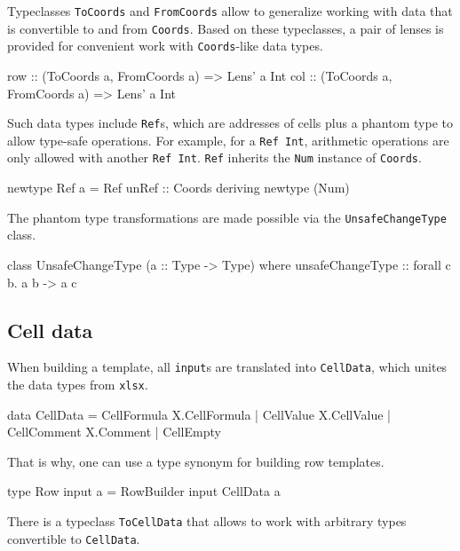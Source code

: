 Typeclasses \texttt{ToCoords} and \texttt{FromCoords} allow to generalize working with data that is convertible to and from \texttt{Coords}. Based on these typeclasses, a pair of lenses is provided for convenient work with \texttt{Coords}-like data types.

\begin{mycode}
row :: (ToCoords a, FromCoords a) => Lens' a Int
col :: (ToCoords a, FromCoords a) => Lens' a Int
\end{mycode}

Such data types include \texttt{Ref}s, which are addresses of cells plus a phantom type to allow type-safe operations. For example, for a \texttt{Ref Int}, arithmetic operations are only allowed with another \texttt{Ref Int}. \texttt{Ref} inherits the \texttt{Num} instance of \texttt{Coords}.

\begin{mycode}
newtype Ref a = Ref {unRef :: Coords} deriving newtype (Num)
\end{mycode}

The phantom type transformations are made possible via the \texttt{UnsafeChangeType} class.

\begin{mycode}
class UnsafeChangeType (a :: Type -> Type) where
  unsafeChangeType :: forall c b. a b -> a c
\end{mycode}

\subsection{Cell data}
\label{sec:celldata}

When building a template, all \texttt{input}s are translated into \texttt{CellData}, which unites the data types from \texttt{xlsx}. 

\begin{mycode}
data CellData
  = CellFormula X.CellFormula
  | CellValue X.CellValue
  | CellComment X.Comment
  | CellEmpty
\end{mycode}

That is why, one can use a type synonym for building row templates.

\begin{mycode}
type Row input a = RowBuilder input CellData a
\end{mycode}

There is a typeclass \texttt{ToCellData} that allows to work with arbitrary types convertible to \texttt{CellData}.


